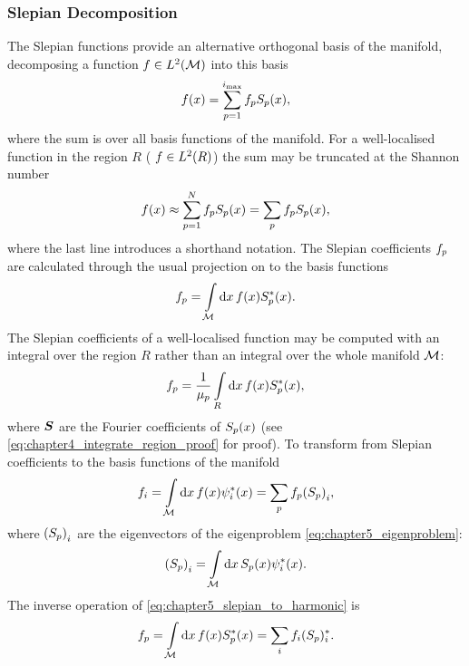 \subsubsection{Slepian Decomposition}

The Slepian functions provide an alternative orthogonal basis of the manifold, decomposing a function \(f \in L^{2}(\mathcal{M})\) into this basis
%
\begin{equation}
	f(x)
	= \sum\limits_{p=1}^{i_{\text{max}}} {f}_{p} {S}_{p}(x),
\end{equation}
%
where the sum is over all basis functions of the manifold.
For a well-localised function in the region \(R\) (\ie{} \(f \in L^{2}(R)\)) the sum may be truncated at the Shannon number
%
\begin{equation}
	f(x)
	\approx \sum\limits_{p=1}^{N} {f}_{p} {S}_{p}(x)
	= \sum\limits_{p} {f}_{p} {S}_{p}(x),
\end{equation}
%
where the last line introduces a shorthand notation.
The Slepian coefficients \({f}_{p}\) are calculated through the usual projection on to the basis functions
%
\begin{equation}
	{f}_{p}
	= \int\limits_{\mathcal{M}} \dd{x} f(x) {S}_{p}^{\ast}(x).
\end{equation}
%
The Slepian coefficients of a well-localised function may be computed with an integral over the region \(R\) rather than an integral over the whole manifold \(\mathcal{M}{}\):
%
\begin{equation}
	{f}_{p}
	= \frac{1}{{\mu}_{p}} \int\limits_{R} \dd{x} f(x) {S}_{p}^{\ast}(x),
\end{equation}
%
where \(\vb*{S}\) are the Fourier coefficients of \({S}_{p}(x)\) (see \cref{eq:chapter4_integrate_region_proof} for proof).
To transform from Slepian coefficients to the basis functions of the manifold
%
\begin{equation}\label{eq:chapter5_slepian_to_harmonic}
	f_{i}
	= \int\limits_{\mathcal{M}} \dd{x} f(x) \psi_{i}^{\ast}(x)
	= \sum\limits_{p} {f}_{p} {({S}_{p})}_{i},
\end{equation}
%
where \({({S}_{p})}_{i}\) are the eigenvectors of the eigenproblem \cref{eq:chapter5_eigenproblem}:
%
\begin{equation}
	{({S}_{p})}_{i}
	= \int\limits_{\mathcal{M}} \dd{x} {S}_{p}(x) \psi_{i}^{\ast}(x).
\end{equation}
%
The inverse operation of \cref{eq:chapter5_slepian_to_harmonic} is
%
\begin{equation}
	{f}_{p}
	= \int\limits_{\mathcal{M}} \dd{x} f(x) {S}_{p}^{\ast}(x)
	= \sum\limits_{i} f_{i} ({S}_{p})^{\ast}_{i}.
\end{equation}

